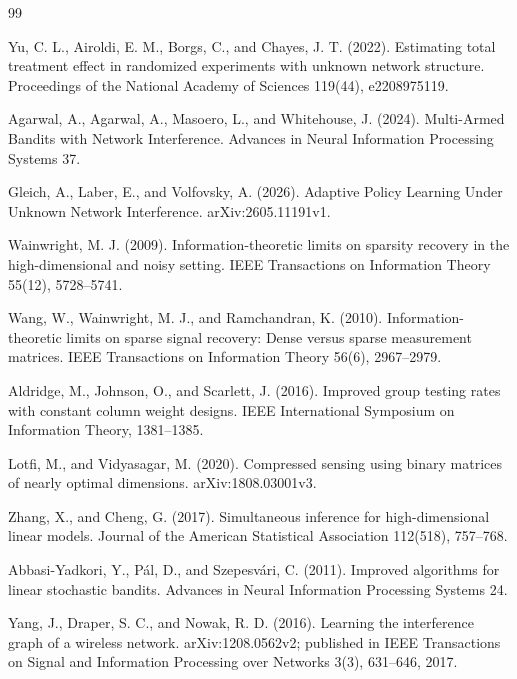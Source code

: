 \documentclass{article}
\begin{document}
\begin{thebibliography}{99}

   Yu, C. L., Airoldi, E. M., Borgs, C., and Chayes, J. T. (2022). Estimating total treatment effect in randomized experiments with unknown network structure. Proceedings of the National Academy of Sciences 119(44), e2208975119.

   Agarwal, A., Agarwal, A., Masoero, L., and Whitehouse, J. (2024). Multi-Armed Bandits with Network Interference. Advances in Neural Information Processing Systems 37.

   Gleich, A., Laber, E., and Volfovsky, A. (2026). Adaptive Policy Learning Under Unknown Network Interference. arXiv:2605.11191v1.

   Wainwright, M. J. (2009). Information-theoretic limits on sparsity recovery in the high-dimensional and noisy setting. IEEE Transactions on Information Theory 55(12), 5728--5741.

   Wang, W., Wainwright, M. J., and Ramchandran, K. (2010). Information-theoretic limits on sparse signal recovery: Dense versus sparse measurement matrices. IEEE Transactions on Information Theory 56(6), 2967--2979.

   Aldridge, M., Johnson, O., and Scarlett, J. (2016). Improved group testing rates with constant column weight designs. IEEE International Symposium on Information Theory, 1381--1385.

   Lotfi, M., and Vidyasagar, M. (2020). Compressed sensing using binary matrices of nearly optimal dimensions. arXiv:1808.03001v3.

   Zhang, X., and Cheng, G. (2017). Simultaneous inference for high-dimensional linear models. Journal of the American Statistical Association 112(518), 757--768.

   Abbasi-Yadkori, Y., Pál, D., and Szepesvári, C. (2011). Improved algorithms for linear stochastic bandits. Advances in Neural Information Processing Systems 24.

   Yang, J., Draper, S. C., and Nowak, R. D. (2016). Learning the interference graph of a wireless network. arXiv:1208.0562v2; published in IEEE Transactions on Signal and Information Processing over Networks 3(3), 631--646, 2017.

\end{thebibliography}
\end{document}

